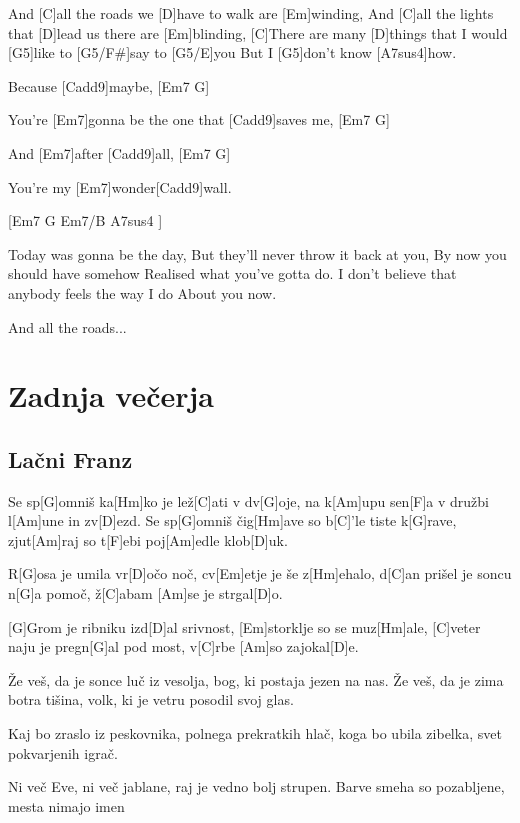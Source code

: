 \documentclass[a4paper,12pt]{article}
\begin{document}
\begin{multicols}{2}
\begin{guitar}
And [C]all the roads 
we [D]have to walk are [Em]winding, 
And [C]all the lights 
that [D]lead us there are [Em]blinding, 
[C]There are many [D]things that I 
would [G5]like to [G5/F#]say to [G5/E]you 
But I [G5]don't know [A7sus4]how. 


Because [Cadd9]maybe, [Em7  G]
 
You're [Em7]gonna be the one that [Cadd9]saves me, [Em7 G]

And [Em7]after [Cadd9]all,     [Em7 G]

You're my [Em7]wonder[Cadd9]wall.


[Em7 G Em7/B A7sus4 ]

Today was gonna be the day, 
But they'll never throw it back at you, 
By now you should have somehow 
Realised what you've gotta do. 
I don't believe that anybody 
feels the way I do 
About you now. 


And all the roads...

\end{guitar}
\section{Zadnja večerja}
\subsection*{Lačni Franz}
\begin{guitar}

Se sp[G]omniš ka[Hm]ko je lež[C]ati v dv[G]oje, 
na k[Am]upu sen[F]a v družbi l[Am]une in zv[D]ezd. 
Se sp[G]omniš čig[Hm]ave so b[C]'le tiste k[G]rave, 
zjut[Am]raj so t[F]ebi poj[Am]edle klob[D]uk. 

  
R[G]osa je umila vr[D]očo noč, 
cv[Em]etje je še z[Hm]ehalo,
d[C]an prišel je soncu n[G]a pomoč, 
ž[C]abam [Am]se je strgal[D]o. 

       
[G]Grom je ribniku izd[D]al srivnost, 
[Em]storklje so se muz[Hm]ale, 
[C]veter naju je pregn[G]al pod most, 
v[C]rbe [Am]so zajokal[D]e. 


Že veš, da je sonce luč iz vesolja, 
bog, ki postaja jezen na nas. 
Že veš, da je zima botra tišina, 
volk, ki je vetru posodil svoj glas. 


Kaj bo zraslo iz peskovnika, 
polnega prekratkih hlač, 
koga bo ubila zibelka, svet pokvarjenih igrač. 


Ni več Eve, ni več jablane, 
raj je vedno bolj strupen. 
Barve smeha so pozabljene, mesta nimajo imen

\end{guitar}

\end{multicols}
\end{document}
